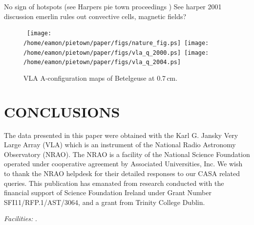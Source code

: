\documentclass[iop]{emulateapj}
\begin{document}
No sign of hotspots (see Harpers pie town proceedings )
See harper 2001 discussion	
emerlin rules out convective cells, magnetic fields?



\begin{figure*}
\mbox{
\texttt{[image: /home/eamon/pietown/paper/figs/nature\_fig.ps]}
\texttt{[image: /home/eamon/pietown/paper/figs/vla\_q\_2000.ps]}
\texttt{[image: /home/eamon/pietown/paper/figs/vla\_q\_2004.ps]}
}
\caption{VLA A-configuration maps of Betelgeuse at 0.7\,cm. }
\label{fig:fig5}
\end{figure*}




\section{CONCLUSIONS}
 


\acknowledgments
The data presented in this paper were obtained with the Karl G. Jansky Very Large Array (VLA) which is an instrument of the National Radio Astronomy Observatory (NRAO). The NRAO is a facility of the National Science Foundation operated under cooperative agreement by Associated Universities, Inc. We wish to thank the NRAO helpdesk for their detailed responses to our CASA related queries. This publication has emanated from research conducted with the financial support of Science Foundation Ireland under Grant Number SFI11/RFP.1/AST/3064, and a grant from Trinity College Dublin.

{\it Facilities:} .




\end{document}
